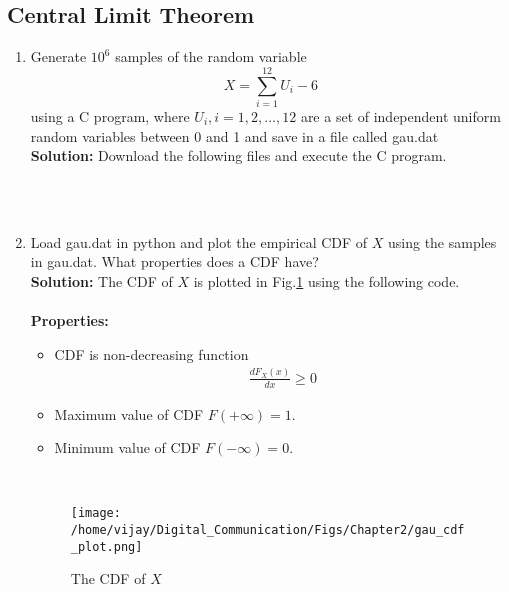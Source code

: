 \documentclass[journal,10pt,twocolumn]{IEEEtran}
\newcounter{Chapcounter}
\numberwithin{equation}{subsection}
\numberwithin{figure}{subsection}
\renewcommand\thesection{\theChapcounter.\arabic{section}}
\newcommand{\solution}{\noindent \textbf{Solution: }}
\renewcommand\thesection{\arabic{section}}
\renewcommand\thesubsection{\thesection.\arabic{subsection}}
\begin{document}
\subsection{\textbf{Central Limit Theorem}}
%
\begin{enumerate}[label=\thesubsection.\arabic*,ref=\thesubsection.\arabic{figure}]
%
\item
Generate $10^6$ samples of the random variable
%
\begin{equation}
X = \sum_{i=1}^{12}U_i -6
\end{equation}
%
using a C program, where $U_i, i = 1,2,\dots, 12$ are  a set of independent uniform random variables between 0 and 1
and save in a file called gau.dat \\
\solution Download the following files and execute the  C program.\\

\\


\
\item
Load gau.dat in python and plot the empirical CDF of $X$ using the samples in gau.dat. What properties does a CDF have?
\\
\solution The CDF of $X$ is plotted in Fig.\ref{fig:gauss_cdf} using the following code.\\

\\

\textbf{Properties:}
\begin{itemize}
\item CDF is non-decreasing function\\
\begin{align}
\frac{dF_X(x)}{dx} \ge 0
\end{align}
\item Maximum value of CDF $F(+\infty)=1$.
\item Minimum value of CDF $F(-\infty)=0$.
\end{itemize}
\
\begin{figure}[!ht]
\centering
\texttt{[image: /home/vijay/Digital\_Communication/Figs/Chapter2/gau\_cdf\_plot.png]}
\caption{The CDF of $X$}
\label{fig:gauss_cdf}
\end{figure}


\end{enumerate}
\end{document}
